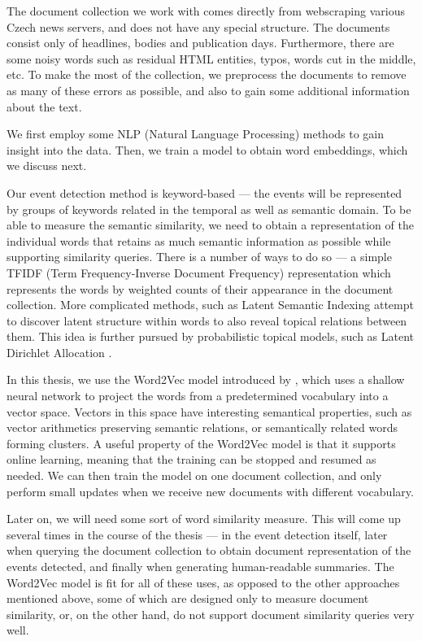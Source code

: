 The document collection we work with comes directly from webscraping various Czech news servers, and does not have any special structure. The documents consist only of headlines, bodies and publication days. Furthermore, there are some noisy words such as residual HTML entities, typos, words cut in the middle, etc. To make the most of the collection, we preprocess the documents to remove as many of these errors as possible, and also to gain some additional information about the text.

We first employ some NLP (Natural Language Processing) methods to gain insight into the data. Then, we train a model to obtain word embeddings, which we discuss next.

Our event detection method is keyword-based --- the events will be represented by groups of keywords related in the temporal as well as semantic domain. To be able to measure the semantic similarity, we need to obtain a representation of the individual words that retains as much semantic information as possible while supporting similarity queries. There is a number of ways to do so --- a simple TFIDF (Term Frequency-Inverse Document Frequency) representation \citep{tfidf, information-retrieval} which represents the words by weighted counts of their appearance in the document collection. More complicated methods, such as Latent Semantic Indexing \citep{lsi} attempt to discover latent structure within words to also reveal topical relations between them. This idea is further pursued by probabilistic topical models, such as Latent Dirichlet Allocation \citep{lda}.

In this thesis, we use the Word2Vec model introduced by \cite{word2vec, distributed-representations, linguistic-regularities}, which uses a shallow neural network to project the words from a predetermined vocabulary into a vector space. Vectors in this space have interesting semantical properties, such as vector arithmetics preserving semantic relations, or semantically related words forming clusters. A useful property of the Word2Vec model is that it supports online learning, meaning that the training can be stopped and resumed as needed. We can then train the model on one document collection, and only perform small updates when we receive new documents with different vocabulary.

Later on, we will need some sort of word similarity measure. This will come up several times in the course of the thesis --- in the event detection itself, later when querying the document collection to obtain document representation of the events detected, and finally when generating human-readable summaries. The Word2Vec model is fit for all of these uses, as opposed to the other approaches mentioned above, some of which are designed only to measure document similarity, or, on the other hand, do not support document similarity queries very well.


